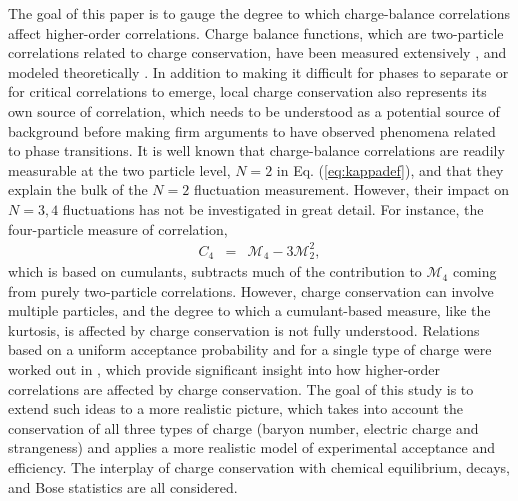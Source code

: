 The goal of this paper is to gauge the degree to which charge-balance correlations affect higher-order correlations. Charge balance functions, which are two-particle correlations related to charge conservation, have been measured extensively \cite{Wang:2012jua,Abelev:2010ab,Li:2011zzx,Alt:2007hk,Adams:2003kg,Aggarwal:2010ya,Alt:2004gx,Abelev:2013csa,Adamczyk:2015yga,Adamczyk:2013hsi,Abelev:2009ac}, and modeled theoretically \cite{Bass:2000az,Bozek:2004dt,Bozek:2003qi,Pratt:2015jsa,Pratt:2017oyf,Ling:2013ksb,Cheng:2004zy,Pratt:2012dz}. In addition to making it difficult for phases to separate or for critical correlations to emerge, local charge conservation also represents its own source of correlation, which needs to be understood as a potential source of background before making firm arguments to have observed phenomena related to phase transitions. It is well known that charge-balance correlations are readily measurable at the two particle level, $N=2$ in Eq. (\ref{eq:kappadef}), and that they explain the bulk of the $N=2$ fluctuation measurement. However, their impact on $N=3,4$ fluctuations has not be investigated in great detail. For instance, the four-particle measure of correlation,
\begin{eqnarray}
C_4&=&\mathcal{M}_4-3\mathcal{M}_2^2,
\end{eqnarray}
which is based on cumulants, subtracts much of the contribution to $\mathcal{M}_4$ coming from purely two-particle correlations. However, charge conservation can involve multiple particles, and the degree to which a cumulant-based measure, like the kurtosis, is affected by charge conservation is not fully understood. Relations based on a uniform acceptance probability and for a single type of charge were worked out in \cite{Savchuk:2019xfg}, which provide significant insight into how higher-order correlations are affected by charge conservation. The goal of this study is to extend such ideas to a more realistic picture, which takes into account the conservation of all three types of charge (baryon number, electric charge and strangeness) and applies a more realistic model of experimental acceptance and efficiency. The interplay of charge conservation with chemical equilibrium, decays, and Bose statistics are all considered.

